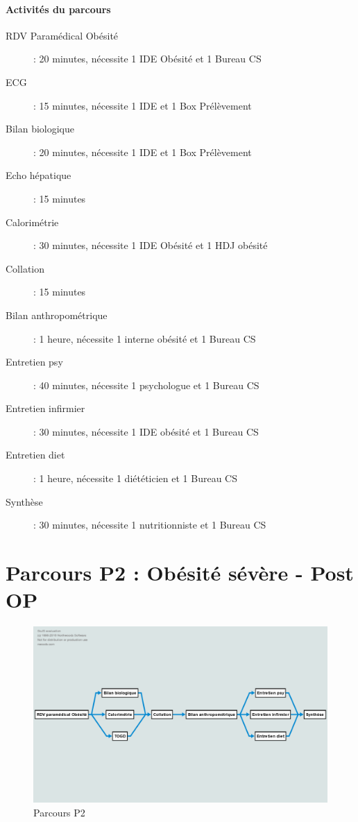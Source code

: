 \documentclass[noposter]{polytech/polytech}
\begin{document}
\paragraph{Activités du parcours}

\begin{description}
	\item[RDV Paramédical Obésité]: 20 minutes, nécessite 1 IDE Obésité et 1 Bureau CS
	\item[ECG]: 15 minutes, nécessite 1 IDE et 1 Box Prélèvement
	\item[Bilan biologique]: 20 minutes, nécessite 1 IDE et 1 Box Prélèvement
	\item[Echo hépatique]: 15 minutes
	\item[Calorimétrie]: 30 minutes, nécessite 1 IDE Obésité et 1 HDJ obésité
	\item[Collation]: 15 minutes
	\item[Bilan anthropométrique]: 1 heure, nécessite 1 interne obésité et 1 Bureau CS
	\item[Entretien psy]: 40 minutes, nécessite 1 psychologue et 1 Bureau CS
	\item[Entretien infirmier]: 30 minutes, nécessite 1 IDE obésité et 1 Bureau CS
	\item[Entretien diet]: 1 heure, nécessite 1 diététicien et 1 Bureau CS
	\item[Synthèse]: 30 minutes, nécessite 1 nutritionniste et 1 Bureau CS 
\end{description}


\section{Parcours P2 : Obésité sévère - Post OP}

\begin{figure}
	\includegraphics[scale=0.35]{images/parcoursP2}
	\caption{Parcours P2}
	\label{fig:P2}
\end{figure}
\end{document}

